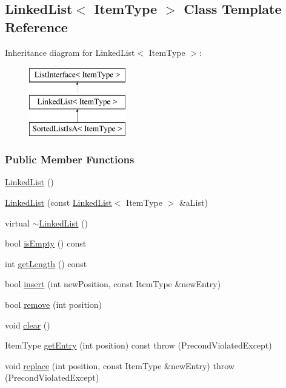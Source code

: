 \hypertarget{class_linked_list}{}\subsection{Linked\+List$<$ Item\+Type $>$ Class Template Reference}
\label{class_linked_list}
Inheritance diagram for Linked\+List$<$ Item\+Type $>$\+:\begin{figure}[H]
\begin{center}
\leavevmode
\includegraphics[height=3.000000cm]{class_linked_list}
\end{center}
\end{figure}
\subsubsection*{Public Member Functions}
\begin{DoxyCompactItemize}
\item 
\hyperlink{class_linked_list_adf8d8164e06b6d358a36df7e53e814ee}{Linked\+List} ()
\item 
\hyperlink{class_linked_list_a6f1443c6120352f1f5b6bd3c0d95e41e}{Linked\+List} (const \hyperlink{class_linked_list}{Linked\+List}$<$ Item\+Type $>$ \&a\+List)
\item 
virtual \hyperlink{class_linked_list_a66aee17d756fe0e002375897383c180b}{$\sim$\+Linked\+List} ()
\item 
bool \hyperlink{class_linked_list_adb17aed0ceacbbe1f247d235f491f0d5}{is\+Empty} () const 
\item 
int \hyperlink{class_linked_list_adae55d6b79235c816cb9e05027fd2e7a}{get\+Length} () const 
\item 
bool \hyperlink{class_linked_list_ae8a19375505e87e2e4fc0e9b5afe4d4d}{insert} (int new\+Position, const Item\+Type \&new\+Entry)
\item 
bool \hyperlink{class_linked_list_a16a02716b5b2efb6fb1e3d18721b53e4}{remove} (int position)
\item 
void \hyperlink{class_linked_list_a7d1d9cf83eef67b6c4d700a3cc5970e1}{clear} ()
\item 
Item\+Type \hyperlink{class_linked_list_a79f005e696c19f6ccf90d9d535afa999}{get\+Entry} (int position) const   throw (\+Precond\+Violated\+Except)
\item 
void \hyperlink{class_linked_list_a3035f880c50e7d8f68e67c093d4607ca}{replace} (int position, const Item\+Type \&new\+Entry)  throw (\+Precond\+Violated\+Except)
\end{DoxyCompactItemize}


